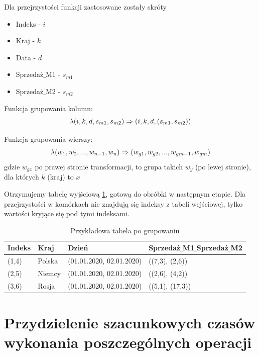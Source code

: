 \documentclass[brudnopis]{xmgr}
\begin{document}
Dla przejrzystości funkcji zastosowane zostały skróty

\begin{itemize}
    \item Indeks - $i$
    \item Kraj - $k$
    \item Data - $d$
    \item Sprzedaż$\_$M1 - $s_{m1}$
    \item Sprzedaż$\_$M2 - $s_{m2}$
\end{itemize}

Funkcja grupowania kolumn:
\begin{equation} \label{eq:example-col-agg}
\lambda (i, k, d, s_{m1}, s_{m2}) \\ \Rightarrow (i, k, d, (s_{m1}, s_{m2}))
\end{equation}

Funkcja grupowania wierszy:
\begin{equation} \label{eq:example-row-agg}
\lambda (w_1, w_2, ..., w_{n-1}, w_n) \\ \Rightarrow (w_{g1}, w_{g2}, ..., w_{gm-1}, w_{gm}) 
\end{equation}
gdzie $w_{gx}$ po prawej stronie transformacji, to grupa takich $w_y$ (po lewej stronie), dla których $k$ (kraj) to $x$

Otrzymujemy tabelę wyjściową \ref{tab:example-output}, gotową do obróbki w następnym etapie.
Dla przejrzystości w komórkach nie znajdują się indeksy z tabeli wejściowej, tylko wartości kryjące się pod tymi indeksami.

\begin{table}[!tbh]
\begin{tabular}{|l|l|l|l|} \hline
Indeks & Kraj & Dzień & Sprzedaż$\_$M1$\_$Sprzedaż$\_$M2 \\ \hline
(1,4) & Polska & (01.01.2020, 02.01.2020) & ((7,3), (2,6)) \\ \hline
(2,5) & Niemcy & (01.01.2020, 02.01.2020) & ((2,6), (4,2)) \\ \hline
(3,6) & Rosja & (01.01.2020, 02.01.2020) & ((5,1), (17,3)) \\ \hline
\end{tabular}
\caption{Przykładowa tabela po grupowaniu\label{tab:example-output}}
\end{table}

\newpage
\section{Przydzielenie szacunkowych czasów wykonania poszczególnych operacji}
\end{document}
